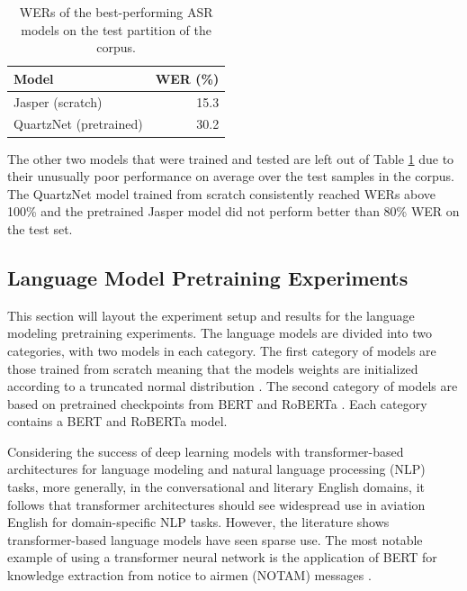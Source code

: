 \documentclass[12pt]{article}
\begin{document}
\begin{table}[!t]
    \centering
    \begin{tabular}{l r}
        \toprule
        Model                  & WER (\%) \\
        \midrule
        Jasper (scratch)       & 15.3     \\
        QuartzNet (pretrained) & 30.2     \\
        \bottomrule
    \end{tabular}
    \caption{WERs of the best-performing ASR models on the test partition of the corpus.}
    \label{tab:asr_performance}
\end{table}

The other two models that were trained and tested are left out of Table \ref{tab:asr_performance} due to their unusually poor performance on average
over the test samples in the corpus. The QuartzNet model trained from scratch consistently reached WERs above 100\% and the pretrained Jasper model
did not perform better than 80\% WER on the test set.

\subsection{Language Model Pretraining Experiments}\label{sec:lm_pretraining}
This section will layout the experiment setup and results for the language modeling pretraining experiments. The language models are divided into two
categories, with two models in each category. The first category of models are those trained from scratch meaning that the models weights are
initialized according to a truncated normal distribution \cite{burkardt_truncated_2014}. The second category of models are based on pretrained
checkpoints from BERT and RoBERTa \cite{devlin_bert_2019,liu_roberta_2019}. Each category contains a BERT and RoBERTa model.

Considering the success of deep learning models with transformer-based architectures for language modeling and natural language processing (NLP)
tasks, more generally, in the conversational and literary English domains, it follows that transformer architectures should see widespread use in
aviation English for domain-specific NLP tasks. However, the literature shows transformer-based language models have seen sparse use. The most notable
example of using a transformer neural network is the application of BERT for knowledge extraction from notice to airmen (NOTAM) messages
\cite{arnold_knowledge_2022}.
\end{document}

